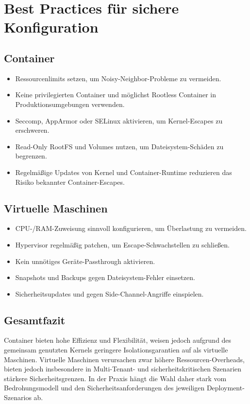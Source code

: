 \documentclass[conference]{IEEEtran}
\begin{document}
\section{Best Practices für sichere Konfiguration}
 
\subsection{Container}
\begin{itemize}
    \item Ressourcenlimits setzen, um Noisy-Neighbor-Probleme zu vermeiden.
    \item Keine privilegierten Container und möglichst Rootless Container in Produktionsumgebungen verwenden.
    \item Seccomp, AppArmor oder SELinux aktivieren, um Kernel-Escapes zu erschweren.
    \item Read-Only RootFS und Volumes nutzen, um Dateisystem-Schäden zu begrenzen.
    \item Regelmäßige Updates von Kernel und Container-Runtime reduzieren das Risiko bekannter Container-Escapes.
\end{itemize}
 
\subsection{Virtuelle Maschinen}
\begin{itemize}
    \item CPU-/RAM-Zuweisung sinnvoll konfigurieren, um Überlastung zu vermeiden.
    \item Hypervisor regelmäßig patchen, um Escape-Schwachstellen zu schließen.
    \item Kein unnötiges Geräte-Passthrough aktivieren.
    \item Snapshots und Backups gegen Dateisystem-Fehler einsetzen.
    \item Sicherheitsupdates und  gegen Side-Channel-Angriffe einspielen.
\end{itemize}
 
\subsection{Gesamtfazit}
Container bieten hohe Effizienz und Flexibilität, weisen jedoch aufgrund des gemeinsam genutzten Kernels geringere Isolationsgarantien auf als virtuelle Maschinen. 
Virtuelle Maschinen verursachen zwar höhere Ressourcen-Overheads, bieten jedoch insbesondere in Multi-Tenant- und sicherheitskritischen Szenarien stärkere Sicherheitsgrenzen. 
In der Praxis hängt die Wahl daher stark vom Bedrohungsmodell und den Sicherheitsanforderungen des jeweiligen Deployment-Szenarios ab.
\end{document}
